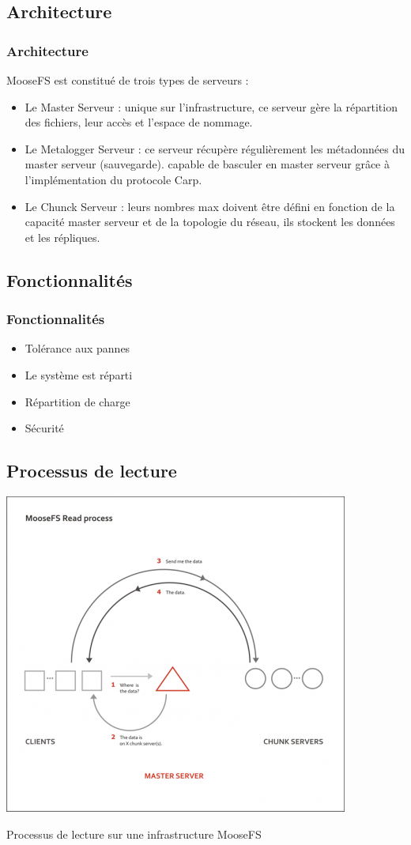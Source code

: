 \documentclass[blue]{beamer}
\begin{document}
\subsection{Architecture}
\begin{frame}
\frametitle{Architecture}
MooseFS est constitué de trois types de serveurs :
\begin{itemize}
			\item Le Master Serveur : unique sur l'infrastructure, ce serveur gère la répartition des fichiers, leur accès et l'espace de nommage.
			\item Le Metalogger Serveur : ce serveur récupère régulièrement les métadonnées du master serveur (sauvegarde). capable de basculer en master serveur grâce à l'implémentation du protocole Carp.
			\item Le Chunck Serveur : leurs nombres max doivent être défini en fonction de la capacité master serveur et de la topologie du réseau, ils stockent les données et les répliques.
		\end{itemize}
\end{frame}

\subsection{Fonctionnalités}
\begin{frame}
\frametitle{Fonctionnalités}
\begin{itemize}
\item Tolérance aux pannes 
\item Le système est réparti
\item Répartition de charge
\item Sécurité
\end{itemize}
\end{frame}

\subsection{Processus de lecture}
\begin{frame}
\begin{center}
\includegraphics[width=0.7\linewidth]{../images/masterread.png}
\end{center}
Processus de lecture sur une infrastructure MooseFS
\end{frame}
\end{document}
